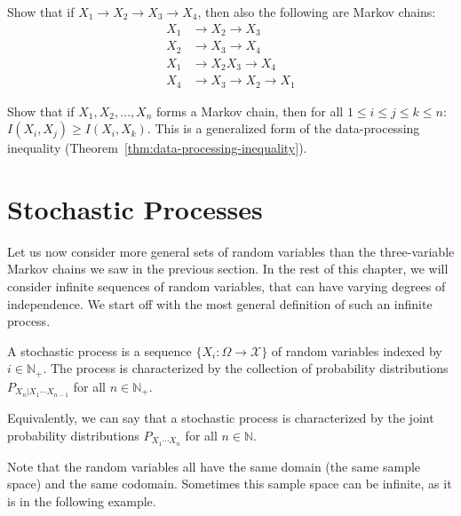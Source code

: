 \begin{exercise}
	Show that if $X_1 \to X_2 \to X_3 \to X_4$, then also the following are Markov chains:
	\begin{align*}
	X_1 &\to X_2 \to X_3\\
	X_2 &\to X_3 \to X_4\\
	X_1 &\to X_2X_3 \to X_4\\
	X_4 &\to X_3 \to X_2 \to X_1
	\end{align*}
\end{exercise}

\begin{exercise}
	Show that if $X_1, X_2, \ldots, X_n$ forms a Markov chain, then for all $1 \leq i \leq j \leq k \leq n$: $I(X_i, X_j) \geq I(X_i,X_k)$. This is a generalized form of the data-processing inequality (Theorem~\ref{thm:data-processing-inequality}).
\end{exercise}

\section{Stochastic Processes}

Let us now consider more general sets of random variables than the three-variable Markov chains we saw in the previous section. In the rest of this chapter, we will consider infinite sequences of random variables, that can have varying degrees of independence. We start off with the most general definition of such an infinite process. 

\begin{definition}
A stochastic process is a sequence $\{X_i : \Omega \to \mathcal{X}\}$ of random variables indexed by $i \in \mathbb{N}_+$. The process is characterized by the collection of probability distributions $P_{X_n|X_1 \cdots X_{n-1}}$ for all $n \in \mathbb{N}_+$.
\end{definition}
Equivalently, we can say that a stochastic process is characterized by the joint probability distributions $P_{X_1 \cdots X_n}$ for all $n \in \mathbb{N}$.

Note that the random variables all have the same domain (the same sample space) and the same codomain. Sometimes this sample space can be infinite, as it is in the following example.

